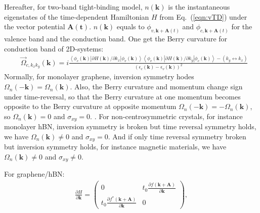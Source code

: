 Hereafter, for two-band tight-binding model, $n(\boldsymbol{k})$ is the instantaneous eigenstates of the time-dependent Hamiltonian $H$ from Eq.~(\ref{eqn:vTD}) under the vector potential $\mathbf{A(t)}$.
$n(\boldsymbol{k})$ equals to $\phi_{v,\boldsymbol k+\mathbf A(t)}$ and $\phi_{c,\boldsymbol k+\mathbf A(t)}$ for the valence band and the conduction band.  One get the Berry curvature for conduction band of 2D-systems:
\begin{align}
	 & \vec{\Omega}_{c,k_xk_y}(\boldsymbol{k})=i  \frac{\left\langle \phi_c(\boldsymbol{k})\left|\partial H(\boldsymbol{k}) / \partial k_x\right| \phi_v(\boldsymbol{k})\right\rangle\left\langle \phi_v(\boldsymbol{k})\left|\partial H(\boldsymbol{k}) / \partial k_y\right| \phi_c(\boldsymbol{k})\right\rangle-(k_y \leftrightarrow k_x)}{\left(\epsilon_{c}(\boldsymbol{k})-\epsilon_{v}(\boldsymbol{k})\right)^{2}}
\end{align}
Normally, for monolayer graphene, inversion symmetry hodes $\Omega_n(\boldsymbol{-k})=\Omega_n(\boldsymbol{k})$. Also, the Berry curvature and momentum change sign under time-reversal, so that the Berry curvature at one momentum becomes opposite to the Berry curvature at opposite momentum $\Omega_n(\boldsymbol{-k})=-\Omega_n(\boldsymbol{k})$, so $\Omega_n(\boldsymbol{k})=0$ and $\sigma_{xy}=0$. \cite{xiao2010berry}. For non-centrosymmetric crystals, for instance monolayer hBN, inversion symmetry is broken but time reversal symmetry holds, we have $\Omega_n(\boldsymbol{k})\neq0$ and $\sigma_{xy}=0$. And if only time reversal symmetry broken but inversion symmetry holds, for instance magnetic materials, we have $\Omega_n(\boldsymbol{k})\neq0$ and $\sigma_{xy}\neq0$.

For graphene/hBN:
\begin{align}
	\frac{\partial H}{\partial \boldsymbol k}=
	\left(\begin{array}{cc}
			      0                                                                            & t_{0} \frac{\partial f(\boldsymbol{k}+\mathbf{A})}{\partial \boldsymbol k} \\
			      t_{0} \frac{\partial f^*(\boldsymbol{k}+\mathbf{A})}{\partial \boldsymbol k} & 0
		      \end{array}\right),
\end{align}



